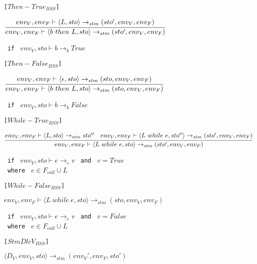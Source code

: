 \texttt{[$Then-True_{BSS}$]}
\begin{center}
	\begin{math}
		\cfrac
			{env_V, env_F \vdash \langle L,sto \rangle \rightarrow_{stm} (sto', env_V, env_F)}
			{env_V, env_F \vdash \langle b\ then\ L, sto \rangle \rightarrow_{stm} (sto', env_V, env_F)}
	\end{math}
	
	\texttt{ if } $env_V, sto \vdash b \rightarrow_b True$
\end{center}

\texttt{[$Then-False_{BSS}$]}
\begin{center}
	\begin{math}
	\cfrac
	{env_V, env_F \vdash \langle \epsilon,sto \rangle \rightarrow_{stm} (sto, env_V, env_F)}
	{env_V, env_F \vdash \langle b\ then\ L, sto \rangle \rightarrow_{stm} (sto, env_V, env_F)}
	\end{math}
	
	\texttt{ if } $env_V, sto \vdash b \rightarrow_b False$
\end{center}

\texttt{[$While-True_{BSS}$]}
\begin{center}
	\begin{math}
		\cfrac
			{env_V, env_F \vdash \langle L, sto \rangle \rightarrow_{stm} sto'' \quad env_V, env_F \vdash \langle L\ while\ e, sto'' \rangle \rightarrow_{stm} (sto', env_V, env_F)}
			{env_V, env_F \vdash \langle L\ while\ e, sto \rangle \rightarrow_{stm} (sto', env_V, env_F)}
	\end{math}
	
	\texttt{ if } $env_V, sto \vdash e \rightarrow_e v$
	\texttt{ and } $v = True$\\
	\texttt{ where } $e \in F_{call} \cup L$
\end{center}

\texttt{[$While-False_{BSS}$]}
\begin{center}
	\begin{math}
	{env_V, env_F \vdash \langle L\ while\ e, sto \rangle \rightarrow_{stm} (sto, env_V, env_F)}
	\end{math}
	
	\texttt{ if } $env_V, sto \vdash e \rightarrow_e v$
	\texttt{ and } $v = False$\\
	\texttt{ where } $e \in F_{call} \cup L$
\end{center}

\texttt{[$StmDlcV_{BSS}$]}
\begin{center}
	$\langle D_V, env_V, sto \rangle \rightarrow_{stm} (env_V', env_F, sto')$
\end{center}

